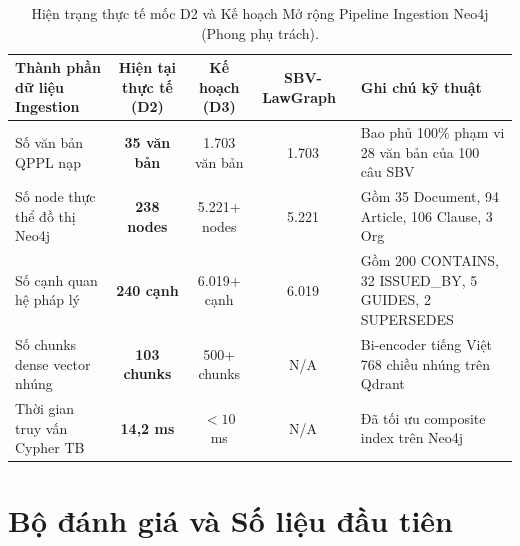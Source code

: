 \documentclass[10pt,a4paper]{article}
\begin{document}
\begin{table}[htbp]
\centering
\small
\caption{Hiện trạng thực tế mốc D2 và Kế hoạch Mở rộng Pipeline Ingestion Neo4j (Phong phụ trách).}
\label{tab:neo4j-metrics}
\begin{tabularx}{\linewidth}{@{}p{4.2cm} c c c X@{}}
\toprule
\textbf{Thành phần dữ liệu Ingestion} & \textbf{Hiện tại thực tế (D2)} & \textbf{Kế hoạch (D3)} & \textbf{SBV-LawGraph~\cite{phan2026sbvlawgraph}} & \textbf{Ghi chú kỹ thuật} \\
\midrule
Số văn bản QPPL nạp & \textbf{35 văn bản} & 1.703 văn bản & 1.703 & Bao phủ 100\% phạm vi 28 văn bản của 100 câu SBV \\
Số node thực thể đồ thị Neo4j & \textbf{238 nodes} & 5.221+ nodes & 5.221 & Gồm 35 Document, 94 Article, 106 Clause, 3 Org \\
Số cạnh quan hệ pháp lý & \textbf{240 cạnh} & 6.019+ cạnh & 6.019 & Gồm 200 CONTAINS, 32 ISSUED\_BY, 5 GUIDES, 2 SUPERSEDES \\
Số chunks dense vector nhúng & \textbf{103 chunks} & 500+ chunks & N/A & Bi-encoder tiếng Việt 768 chiều nhúng trên Qdrant \\
Thời gian truy vấn Cypher TB & \textbf{14{,}2 ms} & $<10$ ms & N/A & Đã tối ưu composite index trên Neo4j \\
\bottomrule
\end{tabularx}
\end{table}

\section{Bộ đánh giá và Số liệu đầu tiên}
\end{document}
